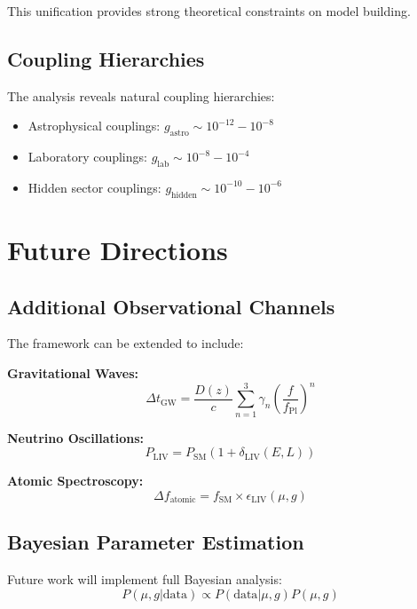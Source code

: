 \documentclass[12pt]{article}
\begin{document}
This unification provides strong theoretical constraints on model building.

\subsection{Coupling Hierarchies}

The analysis reveals natural coupling hierarchies:
\begin{itemize}
\item Astrophysical couplings: $g_{\text{astro}} \sim 10^{-12} - 10^{-8}$
\item Laboratory couplings: $g_{\text{lab}} \sim 10^{-8} - 10^{-4}$
\item Hidden sector couplings: $g_{\text{hidden}} \sim 10^{-10} - 10^{-6}$
\end{itemize}

\section{Future Directions}

\subsection{Additional Observational Channels}

The framework can be extended to include:

\textbf{Gravitational Waves:}
\begin{equation}
\Delta t_{\text{GW}} = \frac{D(z)}{c} \sum_{n=1}^3 \gamma_n \left(\frac{f}{f_{\text{Pl}}}\right)^n
\end{equation}

\textbf{Neutrino Oscillations:}
\begin{equation}
P_{\text{LIV}} = P_{\text{SM}} \left(1 + \delta_{\text{LIV}}(E, L)\right)
\end{equation}

\textbf{Atomic Spectroscopy:}
\begin{equation}
\Delta f_{\text{atomic}} = f_{\text{SM}} \times \epsilon_{\text{LIV}}(\mu, g)
\end{equation}

\subsection{Bayesian Parameter Estimation}

Future work will implement full Bayesian analysis:
\begin{equation}
P(\mu, g | \text{data}) \propto P(\text{data} | \mu, g) P(\mu, g)
\end{equation}
\end{document}
